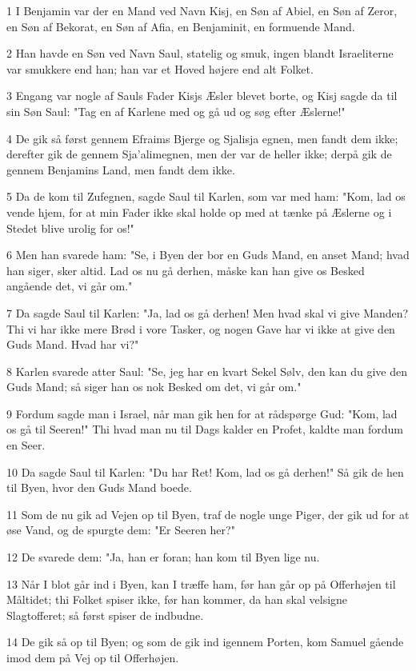 \par 1 I Benjamin var der en Mand ved Navn Kisj, en Søn af Abiel, en Søn af Zeror, en Søn af Bekorat, en Søn af Afia, en Benjaminit, en formuende Mand.
\par 2 Han havde en Søn ved Navn Saul, statelig og smuk, ingen blandt Israeliterne var smukkere end han; han var et Hoved højere end alt Folket.
\par 3 Engang var nogle af Sauls Fader Kisjs Æsler blevet borte, og Kisj sagde da til sin Søn Saul: "Tag en af Karlene med og gå ud og søg efter Æslerne!"
\par 4 De gik så først gennem Efraims Bjerge og Sjalisja egnen, men fandt dem ikke; derefter gik de gennem Sja'alimegnen, men der var de heller ikke; derpå gik de gennem Benjamins Land, men fandt dem ikke.
\par 5 Da de kom til Zufegnen, sagde Saul til Karlen, som var med ham: "Kom, lad os vende hjem, for at min Fader ikke skal holde op med at tænke på Æslerne og i Stedet blive urolig for os!"
\par 6 Men han svarede ham: "Se, i Byen der bor en Guds Mand, en anset Mand; hvad han siger, sker altid. Lad os nu gå derhen, måske kan han give os Besked angående det, vi går om."
\par 7 Da sagde Saul til Karlen: "Ja, lad os gå derhen! Men hvad skal vi give Manden? Thi vi har ikke mere Brød i vore Tasker, og nogen Gave har vi ikke at give den Guds Mand. Hvad har vi?"
\par 8 Karlen svarede atter Saul: "Se, jeg har en kvart Sekel Sølv, den kan du give den Guds Mand; så siger han os nok Besked om det, vi går om."
\par 9 Fordum sagde man i Israel, når man gik hen for at rådspørge Gud: "Kom, lad os gå til Seeren!" Thi hvad man nu til Dags kalder en Profet, kaldte man fordum en Seer.
\par 10 Da sagde Saul til Karlen: "Du har Ret! Kom, lad os gå derhen!" Så gik de hen til Byen, hvor den Guds Mand boede.
\par 11 Som de nu gik ad Vejen op til Byen, traf de nogle unge Piger, der gik ud for at øse Vand, og de spurgte dem: "Er Seeren her?"
\par 12 De svarede dem: "Ja, han er foran; han kom til Byen lige nu.
\par 13 Når I blot går ind i Byen, kan I træffe ham, før han går op på Offerhøjen til Måltidet; thi Folket spiser ikke, før han kommer, da han skal velsigne Slagtofferet; så først spiser de indbudne.
\par 14 De gik så op til Byen; og som de gik ind igennem Porten, kom Samuel gående imod dem på Vej op til Offerhøjen.
